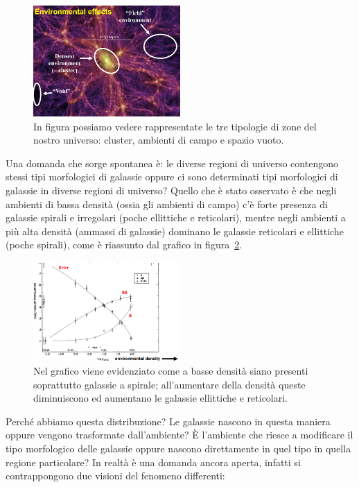 \begin{figure}
	\centering
	\includegraphics[width = 0.5\textwidth]{immagini/non-nomogeneita-universo.png}
	\caption{In figura possiamo vedere rappresentate le tre tipologie di zone del nostro universo: cluster, ambienti di campo e spazio vuoto.}
	\label{fig:non-omogeneo-universo}
\end{figure}

Una domanda che sorge spontanea è: le diverse regioni di universo contengono stessi tipi morfologici di galassie oppure ci sono determinati tipi morfologici di galassie in diverse regioni di universo? Quello che è stato osservato è che negli ambienti di bassa densità (ossia gli ambienti di campo) c’è forte presenza di galassie spirali e irregolari (poche ellittiche e reticolari), mentre negli ambienti a più alta densità (ammassi di galassie) dominano le galassie reticolari e ellittiche (poche spirali), come è riassunto dal grafico in figura~\ref{fig:grafico-densità-morfologia}.

\begin{figure}[!htb]
	\centering
	\includegraphics[width = 0.5\textwidth]{immagini/enviromental-density.png}
	\caption{Nel grafico viene evidenziato come a basse densità siano presenti soprattutto galassie a spirale; all'aumentare della densità queste diminuiscono ed aumentano le galassie ellittiche e reticolari.}
	\label{fig:grafico-densità-morfologia}
\end{figure}

Perché abbiamo questa distribuzione? Le galassie nascono in questa maniera oppure vengono trasformate dall’ambiente? È l’ambiente che riesce a modificare il tipo morfologico delle galassie oppure nascono direttamente in quel tipo in quella regione particolare? In realtà è una domanda ancora aperta, infatti si contrappongono due visioni del fenomeno differenti:

